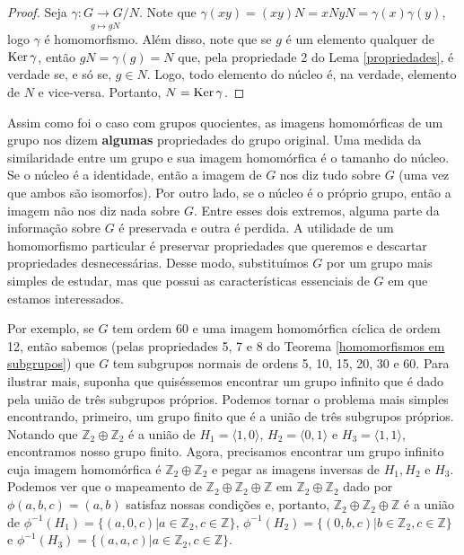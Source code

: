 	\begin{proof}
		Seja $\displaystyle{ \underset{g\mapsto gN}{\gamma : G\to G/N   }}$. Note que $\gamma(xy) = (xy)N = xNyN = \gamma(x)\gamma(y)$, logo $\gamma$ é homomorfismo. Além disso, note que se $g$ é um elemento qualquer de $\operatorname{Ker}\gamma$, então $gN = \gamma(g) = N$ que, pela propriedade 2 do Lema \eqref{propriedades}, é verdade se, e só se, $g\in N$. Logo, todo elemento do núcleo é, na verdade, elemento de $N$ e vice-versa. Portanto, $N = \operatorname{Ker}\gamma$.
	\end{proof}
	\par\vspace{0.3cm} Assim como foi o caso com grupos quocientes, as imagens homomórficas de um grupo nos dizem \textbf{algumas} propriedades do grupo original. Uma medida da similaridade entre um grupo e sua imagem homomórfica é o tamanho do núcleo. Se o núcleo é a identidade, então a imagem de $G$ nos diz tudo sobre $G$ (uma vez que ambos são isomorfos). Por outro lado, se o núcleo é o próprio grupo, então a imagem não nos diz nada sobre $G$. Entre esses dois extremos, alguma parte da informação sobre $G$ é preservada e outra é perdida. A utilidade de um homomorfismo particular é preservar propriedades que queremos e descartar propriedades desnecessárias. Desse modo, substituímos $G$ por um grupo mais simples de estudar, mas que possui as características essenciais de $G$ em que estamos interessados.	\par\vspace{0.3cm} Por exemplo, se $G$ tem ordem 60 e uma imagem homomórfica cíclica de ordem 12, então sabemos (pelas propriedades 5, 7 e 8 do Teorema \eqref{homomorfismos em subgrupos}) que $G$ tem subgrupos normais de ordens 5, 10, 15, 20, 30 e 60. Para ilustrar mais, suponha que quiséssemos encontrar um grupo infinito que é dado pela união de três subgrupos próprios. Podemos tornar o problema mais simples encontrando, primeiro, um grupo finito que é a união de três subgrupos próprios. Notando que $\mathbb{Z}_2\oplus\mathbb{Z}_2$ é a união de $H_1 = \langle 1,0 \rangle$, $H_2 = \langle 0,1 \rangle$ e $H_3 = \langle 1,1 \rangle$, encontramos nosso grupo finito. Agora, precisamos encontrar um grupo infinito cuja imagem homomórfica é $\mathbb{Z}_2\oplus\mathbb{Z}_2$ e pegar as imagens inversas de $H_1, H_2$ e $H_3$. Podemos ver que o mapeamento de $\mathbb{Z}_2\oplus\mathbb{Z}_2\oplus\mathbb{Z}$ em $\mathbb{Z}_2\oplus\mathbb{Z}_2$ dado por $\phi(a,b,c) = (a,b)$ satisfaz nossas condições e, portanto, $\mathbb{Z}_2\oplus\mathbb{Z}_2\oplus\mathbb{Z}$ é a união de $\phi^{-1}(H_1) = \{ (a,0,c)|a\in\mathbb{Z}_2, c\in\mathbb{Z} \}$, $\phi^{-1}(H_2) = \{ (0,b,c)|b\in\mathbb{Z}_2, c\in\mathbb{Z} \}$ e $\phi^{-1}(H_3) = \{ (a,a,c)|a\in\mathbb{Z}_2, c\in\mathbb{Z} \}$.
